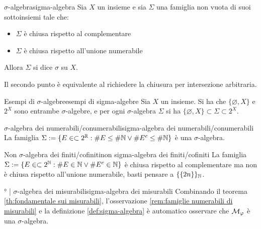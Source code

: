 \begin{definition}{$\sigma$-algebra}{sigma-algebra}
    Sia $X$ un insieme e sia $\Sigma$ una famiglia non vuota di suoi sottoinsiemi tale che:\begin{itemize}
        \item $\Sigma$ è chiusa rispetto al complementare
        \item $\Sigma$ è chiusa rispetto all'unione numerabile
    \end{itemize}
    Allora $\Sigma$ si dice $\sigma$ su $X$.
\end{definition}

\begin{remark}{}{}
    Il secondo punto è equivalente al richiedere la chiusura per intersezione arbitraria.
\end{remark}

\begin{example}{Esempi di $\sigma$-algebre}{esempi di sigma-algebre}
    Sia $X$ un insieme. Si ha che $\{\varnothing, X\}$ e $2^X$ sono entrambe $\sigma$-algebre, e per ogni $\sigma$-algebra $\Sigma$ si ha $\{\varnothing, X\} \subset \Sigma \subset 2^X$.
\end{example}
\begin{example}{$\sigma$-algebra dei numerabili/conumerabili}{sigma-algebra dei numerabili/conumerabili}
    La famiglia $\Sigma := \{E \in \subset 2^{\mathbb{R}} : \# E \le \# \mathbb{N} \vee \# E^c \le \# \mathbb{N} \}$ è una $\sigma$-algebra.
\end{example}
\begin{example}{Non $\sigma$-algebra dei finiti/cofiniti}{non sigma-algebra dei finiti/cofiniti}
    La famiglia $\Sigma := \{E \in \subset 2^{\mathbb{N}} : \# E \in \mathbb{N} \vee \# E^c \in \mathbb{N} \}$ è chiusa rispetto al complementare ma non è chiusa rispetto all'unione numerabile, basti pensare a $\{\{2n\}\}_{\mathbb{N}}$.
\end{example}

\begin{proposition}{° | $\sigma$-algebra dei misurabili}{sigma-algebra dei misurabili}
    Combinando il teorema \ref{th:fondamentale sui misurabili}, l'osservazione \ref{rem:famiglie numerabili di misurabili} e la definizione \ref{def:sigma-algebra} è automatico osservare che $\mathcal{M}_\varphi$ è una $\sigma$-algebra.
\end{proposition}


